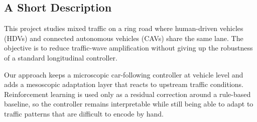 \subsection{A Short Description}
This project studies mixed traffic on a ring road where human-driven vehicles (HDVs) and connected autonomous vehicles (CAVs) share the same lane. The objective is to reduce traffic-wave amplification without giving up the robustness of a standard longitudinal controller.

Our approach keeps a microscopic car-following controller at vehicle level and adds a mesoscopic adaptation layer that reacts to upstream traffic conditions. Reinforcement learning is used only as a residual correction around a rule-based baseline, so the controller remains interpretable while still being able to adapt to traffic patterns that are difficult to encode by hand.
